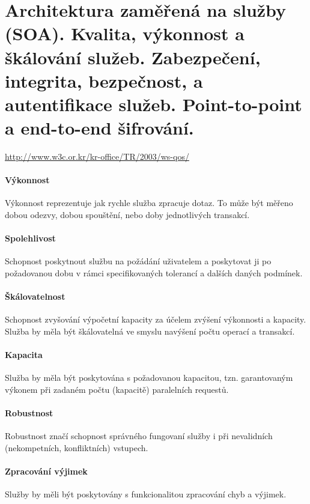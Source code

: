 \section[AOS - Kvalita, bezpečnost]{Architektura zaměřená na služby (SOA). Kvalita, výkonnost a škálování služeb. Zabezpečení, integrita, bezpečnost, a autentifikace služeb. Point-to-point a end-to-end šifrování.}

\url{http://www.w3c.or.kr/kr-office/TR/2003/ws-qos/}

\paragraph{Výkonnost}
Výkonnost reprezentuje jak rychle služba zpracuje dotaz. To může být měřeno dobou odezvy, dobou spouštění, nebo doby jednotlivých transakcí.

\paragraph{Spolehlivost}
Schopnost poskytnout službu na požádání uživatelem a poskytovat ji po požadovanou dobu v rámci specifikovaných tolerancí a dalších daných podmínek.

\paragraph{Škálovatelnost}
Schopnost zvyšování výpočetní kapacity za účelem zvýšení výkonnosti a kapacity. Služba by měla být škálovatelná ve smyslu navýšení počtu operací a transakcí.

\paragraph{Kapacita}
Služba by měla být poskytována s požadovanou kapacitou, tzn. garantovaným výkonem při zadaném počtu (kapacitě) paralelních requestů.

\paragraph{Robustnost}
Robustnost značí schopnost správného fungovaní služby i při nevalidních (nekompetních, konfliktních) vstupech.

\paragraph{Zpracování výjimek}
Služby by měli být poskytovány s funkcionalitou zpracování chyb a výjimek.

